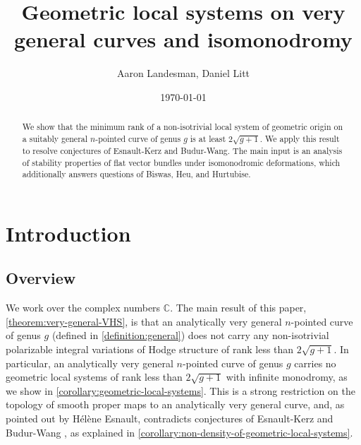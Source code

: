 \documentclass[12 pt]{amsart}
\title{Geometric local systems on very general curves and isomonodromy}
\author{Aaron Landesman, Daniel Litt}
\date{\today}
\theoremstyle{plain}
\theoremstyle{definition}
\theoremstyle{remark}
\numberwithin{equation}{section}
\begin{document}
\begin{abstract}
We show that the minimum rank of a non-isotrivial local system of geometric origin on a
suitably general $n$-pointed curve of genus $g$ is at least $2\sqrt{g+1}$. We apply this result to resolve conjectures of Esnault-Kerz and Budur-Wang. The main input is an analysis of stability
properties of flat vector bundles under isomonodromic deformations, which
additionally answers questions of Biswas, Heu, and Hurtubise.
\end{abstract}


\maketitle

\section{Introduction}
\label{section:introduction}
\subsection{Overview}
\label{subsection:overview}
We work over the complex numbers $\mathbb{C}$. 
The main result of this paper, \autoref{theorem:very-general-VHS}, is that an
analytically very general $n$-pointed curve of genus $g$ 
(defined in \autoref{definition:general})
does not carry any
non-isotrivial polarizable integral variations of Hodge structure of rank less than $2\sqrt{g+1}$. In particular, an
analytically very general $n$-pointed curve of genus $g$ carries no geometric local
systems of rank less than $2\sqrt{g+1}$ with infinite monodromy, as we show in
\autoref{corollary:geometric-local-systems}. This is a strong restriction on the
topology of smooth proper maps to an analytically very general curve, and, as pointed out by H\'el\`ene Esnault, contradicts conjectures of Esnault-Kerz \cite[Conjecture 1.1]{esnault2021local} and Budur-Wang \cite[Conjecture 10.3.1]{budur2020absolute}, as explained in \autoref{corollary:non-density-of-geometric-local-systems}. 
\end{document}
